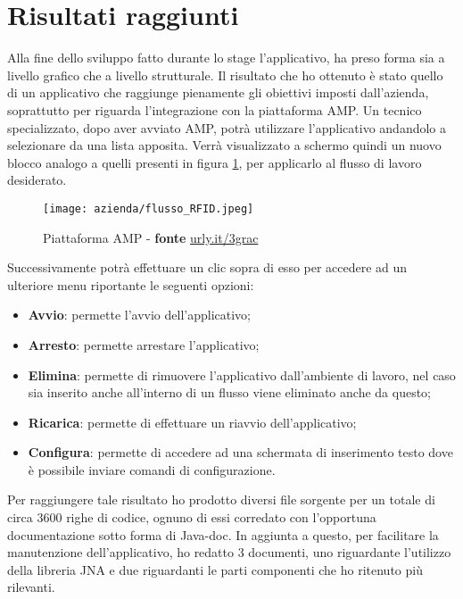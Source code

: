 \section{Risultati raggiunti}
Alla fine dello sviluppo fatto durante lo stage l'applicativo, ha preso forma sia a livello grafico che a livello strutturale.
Il risultato che ho ottenuto è stato quello di un applicativo che raggiunge pienamente gli obiettivi imposti dall’azienda,
soprattutto per riguarda l'integrazione con la piattaforma AMP.
Un tecnico specializzato, dopo aver avviato AMP, potrà utilizzare l'applicativo andandolo a selezionare da una lista apposita.
Verrà visualizzato a schermo quindi un nuovo blocco analogo a quelli presenti in figura \ref{amp-figure}, per applicarlo al
flusso di lavoro desiderato.
\begin{figure}[!h] 
    \centering 
    \texttt{[image: azienda/flusso\_RFID.jpeg]} 
    \caption{Piattaforma AMP - \textbf{fonte} \url{urly.it/3grac} }
    \label{amp-figure}
\end{figure}
Successivamente potrà effettuare un clic sopra di esso per accedere ad un ulteriore menu riportante le seguenti opzioni:
\begin{itemize}
    \item \textbf{Avvio}: permette l'avvio dell'applicativo;
    \item \textbf{Arresto}: permette arrestare l'applicativo;
    \item \textbf{Elimina}: permette di rimuovere l'applicativo dall'ambiente di lavoro, nel caso sia inserito anche all'interno di un flusso
    viene eliminato anche da questo;
    \item \textbf{Ricarica}: permette di effettuare un riavvio dell'applicativo;
    \item \textbf{Configura}: permette di accedere ad una schermata di inserimento testo dove è possibile inviare comandi di configurazione.
\end{itemize}
Per raggiungere tale risultato ho prodotto diversi file sorgente per un totale di circa 3600 righe di codice, ognuno di essi corredato
con l'opportuna documentazione sotto forma di Java-doc. In aggiunta a questo, per facilitare la manutenzione dell'applicativo, ho redatto 3 documenti, uno riguardante l'utilizzo
della libreria JNA e due riguardanti le parti componenti che ho ritenuto più rilevanti.
